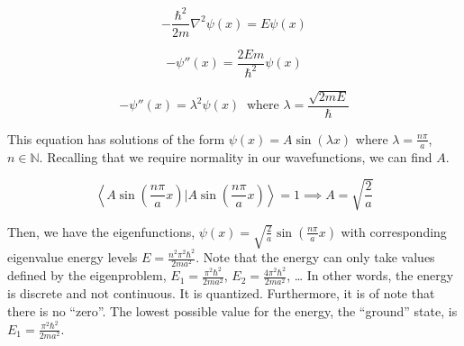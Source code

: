 \documentclass[12pt,]{book}
\begin{document}
\begin{equation}-\frac{\hbar^2}{2m}\nabla^2 \psi(x) = E\psi(x)\label{eq:particle_in_a_box_eigenequation}\end{equation}

\begin{equation}- \psi''(x) = \frac{2Em}{\hbar^2}\psi(x)\label{eq:particle_in_a_box_intermediate}\end{equation}

\begin{equation}-\psi''(x)= \lambda^2\psi(x)\ \text{ where } 
\lambda=\frac{\sqrt{2mE}}{\hbar}\label{eq:solution_particle_in_a_box}\end{equation}

This equation has solutions of the form \(\psi(x)=A\sin(\lambda x)\)
where \(\lambda =\frac{n\pi}{a}\), \(n\in\mathbb{N}\). Recalling that we
require normality in our wavefunctions, we can find \(A\).

\begin{equation}\left\langle A\sin\left(\frac{n\pi}{a} x\right) 
\bigg\rvert A\sin\left(\frac{n\pi}{a} x\right)\right\rangle = 1
\implies A =\sqrt{\frac{2}{a}}
\label{eq:adjointness_finds_lambda}\end{equation}

Then, we have the eigenfunctions,
\(\psi(x)=\sqrt{\frac{2}{a}}\sin\left(\frac{n\pi}{a} x\right)\) with
corresponding eigenvalue energy levels
\(E=\frac{n^2\pi^2\hbar^2}{2ma^2}\). Note that the energy can only take
values defined by the eigenproblem, \(E_1=\frac{\pi^2\hbar^2}{2ma^2}\),
\(E_2=\frac{4\pi^2\hbar^2}{2ma^2}\), \ldots{} In other words, the energy
is discrete and not continuous. It is quantized. Furthermore, it is of
note that there is no ``zero''. The lowest possible value for the
energy, the ``ground'' state, is \(E_1=\frac{\pi^2\hbar^2}{2ma^2}\).

\vfill

\pagebreak
\end{document}

